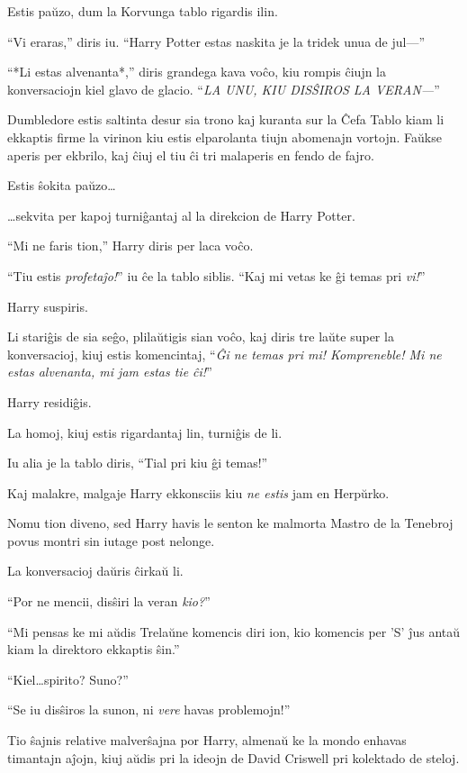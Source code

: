 Estis paŭzo, dum la Korvunga tablo rigardis ilin.

``Vi eraras,'' diris iu. ``Harry Potter estas naskita je la tridek
unua de jul—''

``*Li estas alvenanta*,'' diris grandega kava voĉo, kiu rompis ĉiujn
la konversaciojn kiel glavo de glacio. ``\emph{LA UNU, KIU DISŜIROS LA
VERAN—}''

Dumbledore estis saltinta desur sia trono kaj kuranta sur la Ĉefa
Tablo kiam li ekkaptis firme la virinon kiu estis elparolanta tiujn
abomenajn vortojn. Faŭkse aperis per ekbrilo, kaj ĉiuj el tiu ĉi tri
malaperis en fendo de fajro.

Estis ŝokita paŭzo\ldots

\ldots sekvita per kapoj turniĝantaj al la direkcion de Harry Potter.

``Mi ne faris tion,'' Harry diris per laca voĉo.

``Tiu estis \emph{profetaĵo!}'' iu ĉe la tablo siblis. ``Kaj mi vetas
ke ĝi temas pri \emph{vi!}''

Harry suspiris.

Li stariĝis de sia seĝo, plilaŭtigis sian voĉo, kaj diris tre laŭte
super la konversacioj, kiuj estis komencintaj, ``\emph{Ĝi ne temas pri
mi! Kompreneble! Mi ne estas alvenanta, mi jam estas tie ĉi!}''

Harry residiĝis.

La homoj, kiuj estis rigardantaj lin, turniĝis de li.

Iu alia je la tablo diris, ``Tial pri kiu ĝi temas!''

Kaj malakre, malgaje Harry ekkonsciis kiu \emph{ne estis} jam en
Herpŭrko.

Nomu tion diveno, sed Harry havis le senton ke malmorta Mastro de la
Tenebroj povus montri sin iutage post nelonge.

La konversacioj daŭris ĉirkaŭ li.

``Por ne mencii, disŝiri la veran \emph{kio?}''

``Mi pensas ke mi aŭdis Trelaŭne komencis diri ion, kio komencis per
'S' ĵus antaŭ kiam la direktoro ekkaptis ŝin.''

``Kiel\ldots spirito? Suno?''

``Se iu disŝiros la sunon, ni \emph{vere} havas problemojn!''

Tio ŝajnis relative malverŝajna por Harry, almenaŭ ke la mondo enhavas
timantajn aĵojn, kiuj aŭdis pri la ideojn de David Criswell pri
kolektado de steloj.

